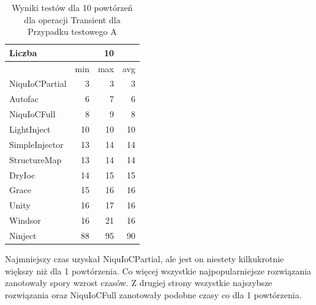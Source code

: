 \documentclass[12pt]{article}
\begin{document}
\begin{table}[H]
\captionsetup{belowskip=0pt,aboveskip=0pt}
\begin{center}
\begin{small}
	\begin{tabular}{ | l | r r r | }
    		\hline
Liczba & & 10 & \\ \hline
 & min & max & avg \\ \hline
NiquIoCPartial & 3 & 3 & 3 \\ \hline
Autofac & 6 & 7 & 6 \\ \hline
NiquIoCFull & 8 & 9 & 8 \\ \hline
LightInject & 10 & 10 & 10 \\ \hline
SimpleInjector & 13 & 14 & 14 \\ \hline
StructureMap & 13 & 14 & 14 \\ \hline
DryIoc & 14 & 15 & 15 \\ \hline
Grace & 15 & 16 & 16 \\ \hline
Unity & 16 & 17 & 16 \\ \hline
Windsor & 16 & 21 & 16 \\ \hline
Ninject & 88 & 95 & 90 \\ \hline
  	\end{tabular}
\end{small}
\end{center}
\caption{Wyniki testów dla 10 powtórzeń dla operacji Transient dla Przypadku testowego A}
\label{TestCaseA_Transient10}
\end{table} 
Najmniejszy czas uzyskał NiquIoCPartial, ale jest on niestety kilkukrotnie większy niż dla 1 powtórzenia. Co więcej wszystkie najpopularniejsze rozwiązania zanotowały spory wzrost czasów. Z drugiej strony wszystkie najszybsze rozwiązania oraz NiquIoCFull zanotowały podobne czasy co dla 1 powtórzenia.
\\ \\
\end{document}
